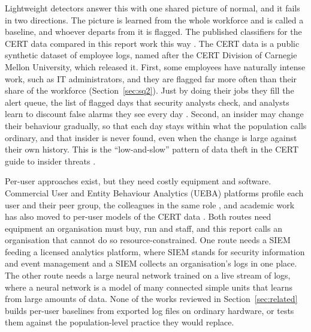 \documentclass[a4paper,12pt]{article}
\begin{document}
Lightweight detectors answer this with one shared picture of normal, and it fails in two directions. The picture is learned from the whole workforce and is called a baseline, and whoever departs from it is flagged. The published classifiers for the CERT data compared in this report work this way \cite{Noever2019}. The CERT data is a public synthetic dataset of employee logs, named after the CERT Division of Carnegie Mellon University, which released it. First, some employees have naturally intense work, such as IT administrators, and they are flagged far more often than their share of the workforce (Section~\ref{sec:sq2}). Just by doing their jobs they fill the alert queue, the list of flagged days that security analysts check, and analysts learn to discount false alarms they see every day \cite{Alahmadi2022}. Second, an insider may change their behaviour gradually, so that each day stays within what the population calls ordinary, and that insider is never found, even when the change is large against their own history. This is the ``low-and-slow'' pattern of data theft in the CERT guide to insider threats \cite{Cappelli2012}.

Per-user approaches exist, but they need costly equipment and software. Commercial User and Entity Behaviour Analytics (UEBA) platforms profile each user and their peer group, the colleagues in the same role \cite{MSSentinelUEBA}, and academic work has also moved to per-user models of the CERT data \cite{Tuor2017,Le2020}. Both routes need equipment an organisation must buy, run and staff, and this report calls an organisation that cannot do so resource-constrained. One route needs a SIEM feeding a licensed analytics platform, where SIEM stands for security information and event management and a SIEM collects an organisation's logs in one place. The other route needs a large neural network trained on a live stream of logs, where a neural network is a model of many connected simple units that learns from large amounts of data. None of the works reviewed in Section~\ref{sec:related} builds per-user baselines from exported log files on ordinary hardware, or tests them against the population-level practice they would replace.
\end{document}
